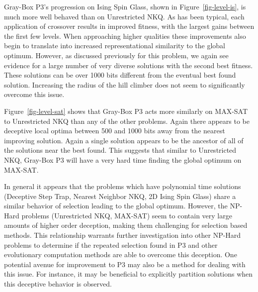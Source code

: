 Gray-Box P3's progression on Ising Spin Glass, shown in Figure~\ref{fig-level-is}, is much more well behaved than on Unrestricted
NKQ. As has been typical, each application of crossover results in improved fitness, with the largest gains between the first few levels.
When approaching higher qualities these improvements also begin to translate into increased representational similarity to the global optimum.
However, as discussed previously for this problem, we again see evidence for a large number of very diverse solutions with the second best
fitness. These solutions can be over 1000 bits different from the eventual best found solution. Increasing the radius of the hill climber
does not seem to significantly overcome this issue.

\begin{figure*}
  \centering
  \caption{Distribution of local optima stored at each level of Gray-Box P3 in relation to the best found by the run on
           a MAX-SAT problem $N=6000$.}
  \label{fig-level-sat}
\end{figure*}

Figure~\ref{fig-level-sat} shows that Gray-Box P3 acts more similarly on MAX-SAT to Unrestricted NKQ than any of the other problems. Again there
appears to be deceptive local optima between 500 and 1000 bits away from the nearest improving solution. Again a single solution appears
to be the ancestor of all of the solutions near the best found. This suggests that similar to Unrestricted NKQ, Gray-Box P3 will have a
very hard time finding the global optimum on MAX-SAT.

In general it appears that the problems which have polynomial time solutions (Deceptive Step Trap, Nearest Neighbor NKQ, 2D Ising Spin Glass)
share a similar behavior of selection leading to the global optimum. However, the NP-Hard problems (Unrestricted NKQ, MAX-SAT) seem to contain
very large amounts of higher order deception, making them challenging for selection based methods. This relationship warrants further investigation
into other NP-Hard problems to determine if the repeated selection found in P3 and other evolutionary computation methods are able to overcome
this deception. One potential avenue for improvement to P3 may also be a method for dealing with this issue. For instance, it may be beneficial to
explicitly partition solutions when this deceptive behavior is observed.

